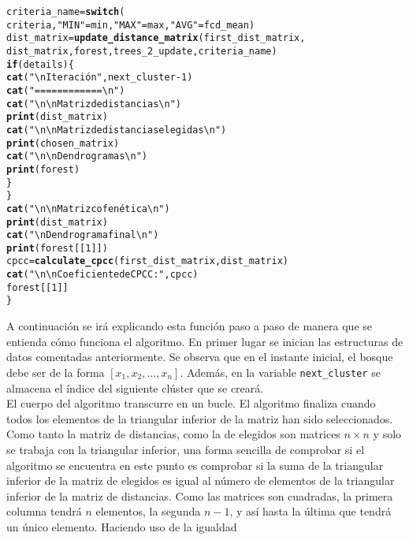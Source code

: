 \documentclass[12pt]{report}\usepackage[]{graphicx}\usepackage[dvipsnames]{xcolor}
\makeatletter
\newcommand{\hlnum}[1]{\textcolor[rgb]{0.686,0.059,0.569}{#1}}%
\newcommand{\hlstr}[1]{\textcolor[rgb]{0.192,0.494,0.8}{#1}}%
\newcommand{\hlopt}[1]{\textcolor[rgb]{0,0,0}{#1}}%
\newcommand{\hlstd}[1]{\textcolor[rgb]{0.345,0.345,0.345}{#1}}%
\newcommand{\hlkwa}[1]{\textcolor[rgb]{0.161,0.373,0.58}{\textbf{#1}}}%
\newcommand{\hlkwb}[1]{\textcolor[rgb]{0.69,0.353,0.396}{#1}}%
\newcommand{\hlkwd}[1]{\textcolor[rgb]{0.737,0.353,0.396}{\textbf{#1}}}%
\newenvironment{kframe}{%
 \def\at@end@of@kframe{}%
 \ifinner\ifhmode%
  \def\at@end@of@kframe{\end{minipage}}%
  \begin{minipage}{\columnwidth}%
 \fi\fi%
 \def\FrameCommand##1{\hskip\@totalleftmargin \hskip-\fboxsep
 \colorbox{shadecolor}{##1}\hskip-\fboxsep
     \hskip-\linewidth \hskip-\@totalleftmargin \hskip\columnwidth}%
 \MakeFramed {\advance\hsize-\width
   \@totalleftmargin\z@ \linewidth\hsize
   \@setminipage}}%
 {\par\unskip\endMakeFramed%
 \at@end@of@kframe}
\newenvironment{knitrout}{}{} %
\makeatother
\begin{document}
\begin{knitrout}
\begin{kframe}
\begin{alltt}
                \hlstd{criteria_name} \hlkwb{=} \hlkwd{switch}\hlstd{(}
                        \hlstd{criteria,} \hlstr{"MIN"} \hlstd{= min,} \hlstr{"MAX"} \hlstd{= max,} \hlstr{"AVG"} \hlstd{= fcd_mean)}
                \hlstd{dist_matrix} \hlkwb{=} \hlkwd{update_distance_matrix}\hlstd{(first_dist_matrix,}
                        \hlstd{dist_matrix, forest, trees_2_update, criteria_name)}
                \hlkwa{if} \hlstd{(details) \{}
                        \hlkwd{cat}\hlstd{(}\hlstr{"\textbackslash{}nIteración"}\hlstd{, next_cluster} \hlopt{-} \hlnum{1}\hlstd{)}
                        \hlkwd{cat}\hlstd{(}\hlstr{"============\textbackslash{}n"}\hlstd{)}
                        \hlkwd{cat}\hlstd{(}\hlstr{"\textbackslash{}n\textbackslash{}nMatriz de distancias\textbackslash{}n"}\hlstd{)}
                        \hlkwd{print}\hlstd{(dist_matrix)}
                        \hlkwd{cat}\hlstd{(}\hlstr{"\textbackslash{}n\textbackslash{}nMatriz de distancias elegidas\textbackslash{}n"}\hlstd{)}
                        \hlkwd{print}\hlstd{(chosen_matrix)}
                        \hlkwd{cat}\hlstd{(}\hlstr{"\textbackslash{}n\textbackslash{}nDendrogramas\textbackslash{}n"}\hlstd{)}
                        \hlkwd{print}\hlstd{(forest)}
                \hlstd{\}}
        \hlstd{\}}
        \hlkwd{cat}\hlstd{(}\hlstr{"\textbackslash{}n\textbackslash{}nMatriz cofenética\textbackslash{}n"}\hlstd{)}
        \hlkwd{print}\hlstd{(dist_matrix)}
        \hlkwd{cat}\hlstd{(}\hlstr{"\textbackslash{}nDendrograma final\textbackslash{}n"}\hlstd{)}
        \hlkwd{print}\hlstd{(forest[[}\hlnum{1}\hlstd{]])}
        \hlstd{cpcc} \hlkwb{=} \hlkwd{calculate_cpcc}\hlstd{(first_dist_matrix, dist_matrix)}
        \hlkwd{cat}\hlstd{(}\hlstr{"\textbackslash{}n\textbackslash{}nCoeficiente de CPCC: "}\hlstd{, cpcc)}
        \hlstd{forest[[}\hlnum{1}\hlstd{]]}
\hlstd{\}}
\end{alltt}
\end{kframe}
\end{knitrout}
		 		
		 		A continuación se irá explicando esta función paso a paso  de manera que se entienda cómo funciona el algoritmo. En primer lugar se inician las estructuras de datos comentadas anteriormente. Se observa que en el instante inicial, el bosque debe ser de la forma $[x_1, x_2, \hdots, x_n]$. Además, en la variable \texttt{next\_cluster} se almacena el índice del siguiente clúster que se creará. \\
		 		
		 		El cuerpo del algoritmo transcurre en un bucle. El algoritmo finaliza cuando todos los elementos de la triangular inferior de la matriz han sido seleccionados. Como tanto la matriz de distancias, como la de elegidos son matrices $n \times n$ y solo se trabaja con la triangular inferior, una forma sencilla de comprobar si el algoritmo se encuentra en este punto es comprobar si la suma de la triangular inferior de la matriz de elegidos es igual al número de elementos de la triangular inferior de la matriz de distancias. Como las matrices son cuadradas, la primera columna tendrá $n$ elementos, la segunda $n-1$, y así hasta la última que tendrá un único elemento. Haciendo uso de la igualdad
		 		
\end{document}
